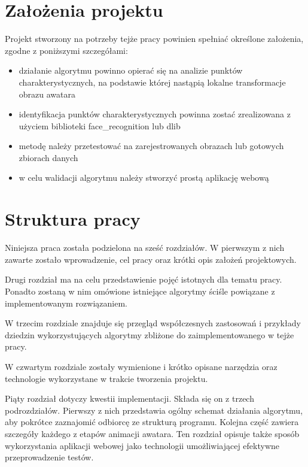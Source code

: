 
\section{Założenia projektu}
\label{sec:zalozeniaProjektu}
Projekt stworzony na potrzeby tejże pracy powinien spełniać określone założenia, zgodne z poniższymi szczegółami:
\begin{itemize}
    \item działanie algorytmu powinno opierać się na analizie punktów charakterystycznych, na podstawie której nastąpią lokalne transformacje obrazu awatara
    \item identyfikacja punktów charakterystycznych powinna zostać zrealizowana z użyciem biblioteki face\_recognition lub dlib
    \item metodę należy przetestować na zarejestrowanych obrazach lub gotowych zbiorach danych
    \item w celu walidacji algorytmu należy stworzyć prostą aplikację webową
\end{itemize}


\section{Struktura pracy}
\label{sec:strukturaPracy}
Niniejsza praca została podzielona na sześć rozdziałów. W pierwszym z nich zawarte zostało wprowadzenie, cel pracy oraz krótki opis założeń projektowych.

Drugi rozdział ma na celu przedstawienie pojęć istotnych dla tematu pracy. Ponadto zostaną w nim omówione istniejące algorytmy ściśle powiązane z implementowanym rozwiązaniem. 

W trzecim rozdziale znajduje się przegląd współczesnych zastosowań i przykłady dziedzin wykorzystujących algorytmy zbliżone do zaimplementowanego w tejże pracy. 

W czwartym rozdziale zostały wymienione i krótko opisane narzędzia oraz technologie wykorzystane w trakcie tworzenia projektu.

Piąty rozdział dotyczy kwestii implementacji. Składa się on z trzech podrozdziałów. Pierwszy z nich przedstawia ogólny schemat działania algorytmu, aby pokrótce zaznajomić odbiorcę ze strukturą programu. Kolejna część zawiera szczegóły każdego z etapów animacji awatara. Ten rozdział opisuje także sposób wykorzystania aplikacji webowej jako technologii umożliwiającej efektywne przeprowadzenie testów.

